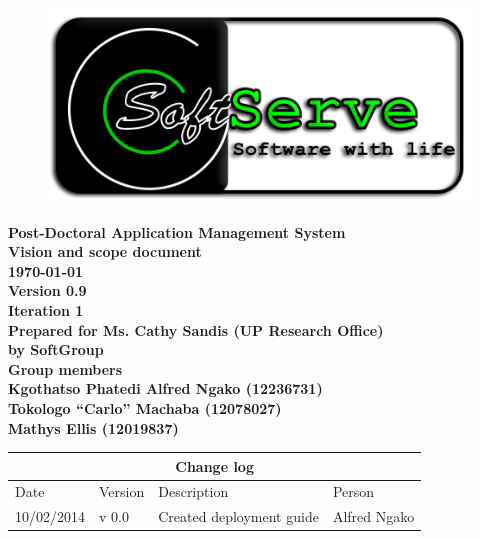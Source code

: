 \documentclass[12pt]{article}
\newcommand{\Title}{Vision and scope document} %
\newcommand{\ssr}{Soft\color{green}{Serve }\color{black}}
\newcommand{\version}{0.9}
\newcommand{\iteration}{1}
\newcommand{\client}{Ms. Cathy Sandis (UP Research Office)}
\newcommand{\project}{Post-Doctoral Application Management System}
\begin{document}
\vspace{4em}

\begin{center}%

\begin{figure}[ht!]
\centering
\includegraphics{../Images_Docs/logo.png}
\end{figure}
\LARGE \bf \project \\[1em]
\LARGE \bf \Title \\[0.25em]
\large \bf \today\\
\bf Version \version\\
\bf Iteration \iteration\\[0.5em]
\Large \bf Prepared for \client\\
\Large \bf by
\Large {\bf \ssr Group }\\[0.5em]
\LARGE {\bf Group members}\\[0.25em]
\large
Kgothatso Phatedi Alfred Ngako (12236731) \\[0.5em]
Tokologo “Carlo” Machaba (12078027) \\[0.5em]
Mathys Ellis (12019837) \\[8em]

\end{center}%


\begin{center}
\begin{tabular}{|l|p{1.4cm}|p{8cm}|p{2.8cm}|}
\hline
\multicolumn{4}{|c|}{\bf Change log} \\
\hline
 Date & Version & Description &  Person \\
\hline
10/02/2014 & v 0.0 & Created deployment guide & Alfred Ngako \\
\hline

\end{tabular}
\end{center}
\newpage
\tableofcontents
\end{document}
